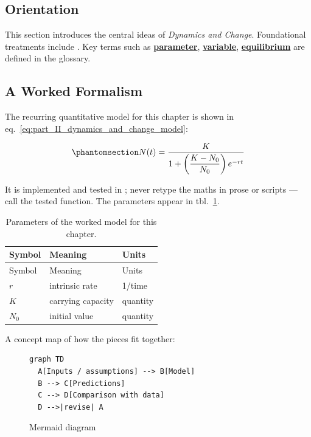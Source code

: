 \documentclass[
]{article}
\theoremstyle{plain}
\theoremstyle{definition}
\begin{document}
\subsection{Orientation}\label{orientation-6}

This section introduces the central ideas of \emph{Dynamics and Change}.
Foundational treatments include
\citep{brown2017principles, wilson2021analysis}. Key terms such as
\hyperref[gl:parameter]{\textbf{parameter}},
\hyperref[gl:variable]{\textbf{variable}},
\hyperref[gl:equilibrium]{\textbf{equilibrium}} are defined in the
glossary.

\subsection{A Worked Formalism}\label{a-worked-formalism-6}

The recurring quantitative model for this chapter is shown in
eq.~\ref{eq:part_II_dynamics_and_change_model}:

\begin{equation}\protect\phantomsection\label{eq:part_II_dynamics_and_change_model}{ N(t) = \frac{K}{1 + \left(\dfrac{K - N_0}{N_0}\right) e^{-rt}} }\end{equation}

It is implemented and tested in
; never retype the maths in
prose or scripts --- call the tested function. The parameters appear in
tbl.~\ref{tbl:part_II_dynamics_and_change_parameters}.

\begin{longtable}[]{@{}lll@{}}
\caption{Parameters of the worked model for this
chapter.}\label{tbl:part_II_dynamics_and_change_parameters}\tabularnewline
\toprule\noalign{}
Symbol & Meaning & Units \\
\midrule\noalign{}
\endfirsthead
\toprule\noalign{}
Symbol & Meaning & Units \\
\midrule\noalign{}
\endhead
\bottomrule\noalign{}
\endlastfoot
\(r\) & intrinsic rate & 1/time \\
\(K\) & carrying capacity & quantity \\
\(N_0\) & initial value & quantity \\
\end{longtable}

A concept map of how the pieces fit together:

\begin{figure}[htbp]
\centering
\begin{verbatim}
graph TD
  A[Inputs / assumptions] --> B[Model]
  B --> C[Predictions]
  C --> D[Comparison with data]
  D -->|revise| A
\end{verbatim}
\caption{Mermaid diagram}
\end{figure}
\end{document}
